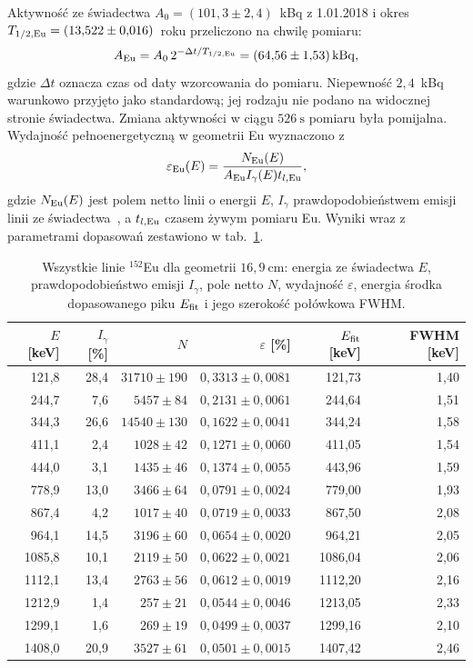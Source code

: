 \documentclass[twocolumn,a4paper,10pt]{article}
\begin{document}
Aktywność ze świadectwa $A_0=(101{,}3\pm2{,}4)$~kBq
z 1.01.2018 i okres $T_{1/2,\rm Eu}=(13{,}522\pm0{,}016)$~roku
przeliczono na chwilę pomiaru:
\begin{equation}
A_{\rm Eu}=A_0\,2^{-\Delta t/T_{1/2,\rm Eu}}
=(64{,}56\pm1{,}53)\,\mathrm{kBq},
\label{eq:activity}
\end{equation}
gdzie $\Delta t$ oznacza czas od daty wzorcowania do pomiaru. Niepewność $2{,}4$~kBq
warunkowo przyjęto jako standardową; jej rodzaju nie podano
na widocznej stronie świadectwa. Zmiana aktywności w ciągu
$526~\mathrm{s}$ pomiaru była pomijalna.
Wydajność pełnoenergetyczną w geometrii Eu wyznaczono z
\begin{equation}
\varepsilon_{\rm Eu}(E)=
\frac{N_{\rm Eu}(E)}{A_{\rm Eu}I_\gamma(E)t_{l,\rm Eu}},
\label{eq:eff}
\end{equation}
gdzie $N_{\rm Eu}(E)$ jest polem netto linii o energii $E$,
$I_\gamma$ prawdopodobieństwem emisji linii
ze świadectwa~\cite{cert}, a $t_{l,\rm Eu}$ czasem żywym
pomiaru Eu. Wyniki wraz z parametrami dopasowań
zestawiono w tab.~\ref{tab:eu}.
\begin{table}[t]
\centering\small
\caption{Wszystkie linie $^{152}$Eu dla geometrii
$16{,}9~\mathrm{cm}$: energia ze świadectwa $E$,
prawdopodobieństwo emisji $I_\gamma$, pole netto $N$,
wydajność $\varepsilon$, energia środka dopasowanego
piku $E_{\rm fit}$ i jego szerokość połówkowa FWHM.}
\label{tab:eu}
\begin{tabular}{rrrrrr}
\toprule
$E$ [keV] & $I_\gamma$ [\%] & $N$ & $\varepsilon$ [\%] &
$E_{\rm fit}$ [keV] & FWHM [keV]\\
\midrule
121,8 & 28,4 & $31710\pm190$ & $0,3313\pm0,0081$ & 121,73 & 1,40\\
244,7 & 7,6 & $5457\pm84$ & $0,2131\pm0,0061$ & 244,64 & 1,51\\
344,3 & 26,6 & $14540\pm130$ & $0,1622\pm0,0041$ & 344,24 & 1,58\\
411,1 & 2,4 & $1028\pm42$ & $0,1271\pm0,0060$ & 411,05 & 1,54\\
444,0 & 3,1 & $1435\pm46$ & $0,1374\pm0,0055$ & 443,96 & 1,59\\
778,9 & 13,0 & $3466\pm64$ & $0,0791\pm0,0024$ & 779,00 & 1,93\\
867,4 & 4,2 & $1017\pm40$ & $0,0719\pm0,0033$ & 867,50 & 2,08\\
964,1 & 14,5 & $3196\pm60$ & $0,0654\pm0,0020$ & 964,21 & 2,05\\
1085,8 & 10,1 & $2119\pm50$ & $0,0622\pm0,0021$ & 1086,04 & 2,06\\
1112,1 & 13,4 & $2763\pm56$ & $0,0612\pm0,0019$ & 1112,20 & 2,16\\
1212,9 & 1,4 & $257\pm21$ & $0,0544\pm0,0046$ & 1213,05 & 2,33\\
1299,1 & 1,6 & $269\pm19$ & $0,0499\pm0,0037$ & 1299,16 & 2,10\\
1408,0 & 20,9 & $3527\pm61$ & $0,0501\pm0,0015$ & 1407,42 & 2,46\\
\bottomrule
\end{tabular}
\end{table}
\end{document}
